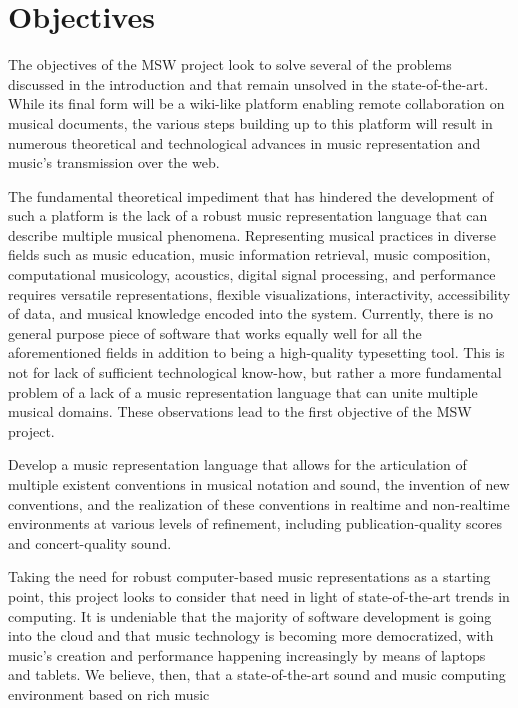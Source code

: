 \documentclass{article}
\begin{document}
\section{Objectives}\label{sec:objectives}
The objectives of the MSW project look to solve several of the problems
discussed in the introduction and that remain unsolved in the
state-of-the-art. While its final form will be a wiki-like platform enabling
remote collaboration on musical documents, the various steps building up to
this platform will result in numerous theoretical and technological advances
in music representation and music's transmission over the web.

The fundamental theoretical impediment that has hindered the development of
such a platform is the lack of a robust music representation language that
can describe multiple musical phenomena.
Representing musical practices in diverse fields such as music education, music
information retrieval, music composition, computational musicology,
acoustics, digital signal processing, and performance requires versatile representations, flexible
visualizations, interactivity, accessibility of data, and musical knowledge
encoded into the system. Currently, there is no general purpose piece of
software that works equally well for all the aforementioned fields in
addition to being a high-quality typesetting tool. This is not for lack of
sufficient technological know-how, but rather a more fundamental problem of
a lack of a music representation language that can unite multiple musical
domains. These observations lead to the first objective of the MSW project.
\begin{objective}
Develop a music representation language that allows for the articulation of multiple
existent conventions in musical notation and sound, the invention of new
conventions, and the realization of these conventions in realtime and
non-realtime environments at various levels of refinement, including
publication-quality scores and concert-quality sound.
\end{objective}
Taking the need for robust computer-based music representations as a
starting point, this project looks to consider that need in light of
state-of-the-art trends in computing. It is undeniable that the majority of
software development is going into the cloud and that music technology is
becoming more democratized, with music’s creation and performance happening
increasingly by means of laptops and tablets. We believe, then, that a
state-of-the-art sound and music computing environment based on rich music
\end{document}
